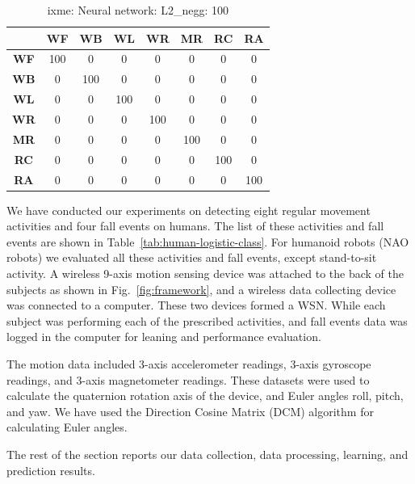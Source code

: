 \documentclass{IEEEtran}
\begin{document}
\begin{table}
\caption{ixme: Neural network: L2\_negg: 100}
\resizebox{\columnwidth}{!}
{
\begin{tabular}{|c|c|c|c|c|c|c|c|}
\hline 
 & \textbf{WF} & \textbf{WB} & \textbf{WL} & \textbf{WR} & \textbf{MR} & 
\textbf{RC} & \textbf{RA} \\ \hline 
\textbf{WF} & 100 &  0 &  0 &  0 &  0 &  0 &  0 \\ \hline
\textbf{WB} & 0 &  100 &  0 &  0 &  0 &  0 &  0 \\ \hline
\textbf{WL} & 0 &  0 &  100 &  0 &  0 &  0 &  0 \\ \hline
\textbf{WR} & 0 &  0 &  0 &  100 &  0 &  0 &  0 \\ \hline
\textbf{MR} & 0 &  0 &  0 &  0 &  100 &  0 &  0 \\ \hline
\textbf{RC} & 0 &  0 &  0 &  0 &  0 &  100 &  0 \\ \hline
\textbf{RA} & 0 &  0 &  0 &  0 &  0 &  0 &  100 \\ \hline
\end{tabular}
}
\end{table}



We have conducted our experiments on detecting eight regular movement activities and four fall events on 
humans. The list of these activities and fall events are shown in Table~\ref{tab:human-logistic-class}. For humanoid robots (NAO robots) we evaluated all these activities and fall events, except stand-to-sit activity. 
 A wireless 9-axis  motion sensing device was attached to the back of the subjects as shown in Fig.~\ref{fig:framework}, and a wireless data collecting device was connected to a computer. These two devices formed a WSN. While each subject was performing each of the prescribed activities, and fall events data was logged in the computer for leaning and performance evaluation.
\par
The motion data included 3-axis accelerometer readings, 3-axis gyroscope readings, and 3-axis magnetometer readings. These datasets were used to calculate
the quaternion rotation axis of the device, and Euler angles roll, pitch, and yaw. We have used the Direction Cosine Matrix (DCM) algorithm for calculating Euler angles. 
\par
The rest of the  section reports our data collection, data processing, learning, 
and prediction results.


\end{document}
